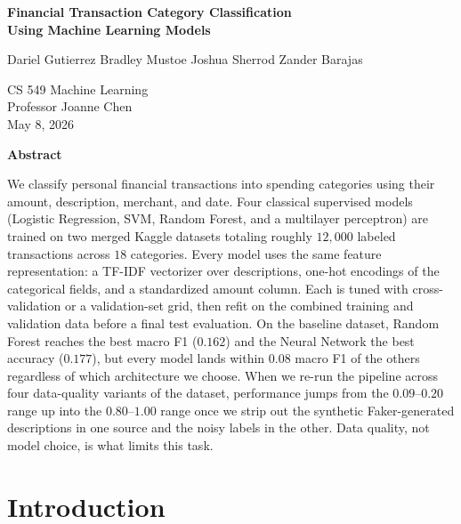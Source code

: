 \documentclass[11pt]{article}
\begin{document}
\begin{center}
{\LARGE\bfseries Financial Transaction Category Classification \\[0.25em]
Using Machine Learning Models \par}

\vspace{1.8em}

{\large Dariel Gutierrez \quad Bradley Mustoe \quad Joshua Sherrod \quad Zander Barajas \par}

\vspace{1em}

{\normalsize CS 549 Machine Learning \\
Professor Joanne Chen \\
May 8, 2026 \par}
\end{center}

\vspace{2em}

\begin{center}
{\large\bfseries Abstract}
\end{center}
\vspace{-0.5em}

\noindent
We classify personal financial transactions into spending categories
using their amount, description, merchant, and date. Four classical
supervised models (Logistic Regression, SVM, Random Forest, and a
multilayer perceptron) are trained on two merged Kaggle datasets
totaling roughly $12{,}000$ labeled transactions across $18$
categories. Every model uses the same feature representation: a TF-IDF
vectorizer over descriptions, one-hot encodings of the categorical
fields, and a standardized amount column. Each is tuned with
cross-validation or a validation-set grid, then refit on the combined
training and validation data before a final test evaluation. On the
baseline dataset, Random Forest reaches the best macro F1 ($0.162$)
and the Neural Network the best accuracy ($0.177$), but every model
lands within $0.08$ macro F1 of the others regardless of which
architecture we choose. When we re-run the pipeline across four
data-quality variants of the dataset, performance jumps from the
$0.09$--$0.20$ range up into the $0.80$--$1.00$ range once we strip
out the synthetic Faker-generated descriptions in one source and the
noisy labels in the other. Data quality, not model choice, is what
limits this task.

\newpage

\section{Introduction}
\end{document}
